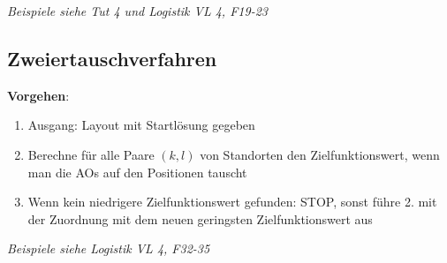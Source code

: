 \textit{Beispiele siehe Tut 4 und Logistik VL 4, F19-23}

\subsection{Zweiertauschverfahren}
\textbf{Vorgehen}: 
\begin{enumerate}
	\item Ausgang: Layout mit Startlösung gegeben
	\item Berechne für alle Paare $(k,l)$ von Standorten den Zielfunktionswert, wenn man die AOs auf den Positionen tauscht
	\item Wenn kein niedrigere Zielfunktionswert gefunden: STOP, sonst führe 2. mit der Zuordnung mit dem neuen geringsten Zielfunktionswert aus
\end{enumerate}

\textit{Beispiele siehe Logistik VL 4, F32-35}